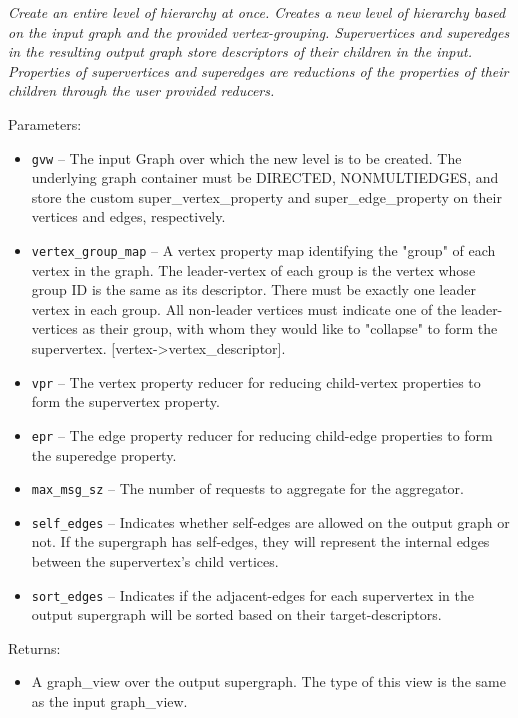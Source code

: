 \textit{
Create an entire level of hierarchy at once.  Creates a new level of hierarchy based on the input graph and the provided vertex-grouping. 
Supervertices and superedges in the resulting output graph store descriptors of their children in the input. 
Properties of supervertices and superedges are reductions of the properties of their children through the user provided reducers.
}
\vspace{0.4cm}

Parameters:
\begin{itemize}
\item
\texttt{gvw} --
The input Graph over which the new level is to be created. The underlying graph container must be DIRECTED, NONMULTIEDGES, and store the custom super\_vertex\_property and super\_edge\_property on their vertices and edges, respectively.
\item
\texttt{vertex\_group\_map} --
A vertex property map identifying the "group" of each vertex in the graph. The leader-vertex of each group is the vertex whose group ID is the same as its descriptor. There must be exactly one leader vertex in each group. All non-leader vertices must indicate one of the leader-vertices as their group, with whom they would like to "collapse" to form the supervertex. [vertex->vertex\_descriptor].
\item
\texttt{vpr} --
The vertex property reducer for reducing child-vertex properties to form the supervertex property.
\item
\texttt{epr} --
The edge property reducer for reducing child-edge properties to form the superedge property.
\item
\texttt{max\_msg\_sz} --
The number of requests to aggregate for the aggregator.
\item
\texttt{self\_edges} --
Indicates whether self-edges are allowed on the output graph or not. If the supergraph has self-edges, they will represent the internal edges between the supervertex's child vertices.
\item
\texttt{sort\_edges} --
Indicates if the adjacent-edges for each supervertex in the output supergraph will be sorted based on their target-descriptors.
\end{itemize}

Returns:
\begin{itemize}
\item
A graph\_view over the output supergraph. The type of this view is the same as the input graph\_view. 
\end{itemize}

